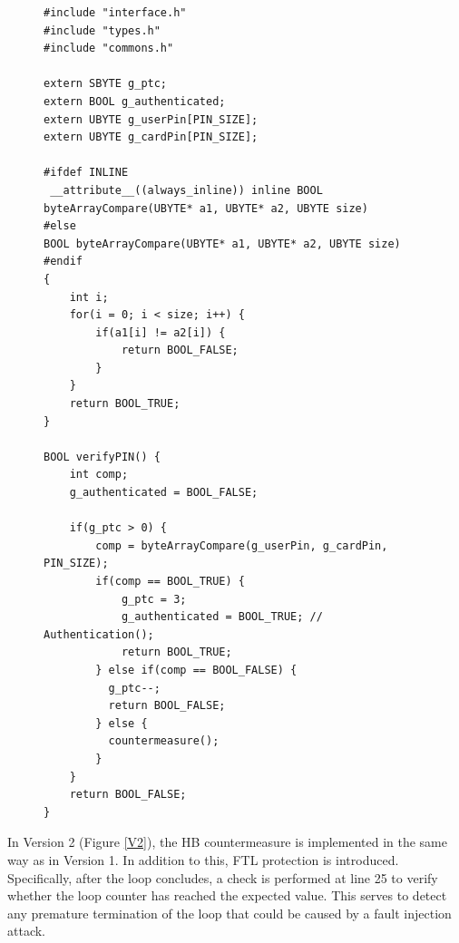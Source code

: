\begin{figure}
\begin{lstlisting}[caption={code.c of VerifyPin function in benchmark V1}, label={V1}, basicstyle=\ttfamily\footnotesize]
#include "interface.h"
#include "types.h"
#include "commons.h"

extern SBYTE g_ptc;
extern BOOL g_authenticated;
extern UBYTE g_userPin[PIN_SIZE];
extern UBYTE g_cardPin[PIN_SIZE];

#ifdef INLINE
 __attribute__((always_inline)) inline BOOL byteArrayCompare(UBYTE* a1, UBYTE* a2, UBYTE size)
#else
BOOL byteArrayCompare(UBYTE* a1, UBYTE* a2, UBYTE size)
#endif
{
    int i;
    for(i = 0; i < size; i++) {
        if(a1[i] != a2[i]) {
            return BOOL_FALSE;
        }
    }
    return BOOL_TRUE;
}

BOOL verifyPIN() {
    int comp;
    g_authenticated = BOOL_FALSE;

    if(g_ptc > 0) {
        comp = byteArrayCompare(g_userPin, g_cardPin, PIN_SIZE);
        if(comp == BOOL_TRUE) {
            g_ptc = 3;
            g_authenticated = BOOL_TRUE; // Authentication();
            return BOOL_TRUE;
        } else if(comp == BOOL_FALSE) {
          g_ptc--;
          return BOOL_FALSE;
        } else {
          countermeasure();
        }
    }
    return BOOL_FALSE;
}
\end{lstlisting}
\end{figure}

In Version 2 (Figure \ref{V2}), the HB countermeasure is implemented in the same way as in Version 1. In addition to this, FTL protection is introduced. Specifically, after the loop concludes, a check is performed at line 25 to verify whether the loop counter has reached the expected value. This serves to detect any premature termination of the loop that could be caused by a fault injection attack.

